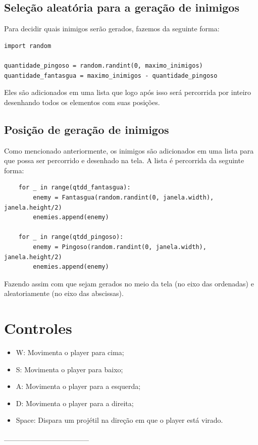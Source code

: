 \documentclass[a4paper]{scrreprt}
\begin{document}
	\subsection{Seleção aleatória para a geração de inimigos}
	Para decidir quais inimigos serão gerados, fazemos da seguinte forma:
	\begin{lstlisting}
import random

quantidade_pingoso = random.randint(0, maximo_inimigos)
quantidade_fantasgua = maximo_inimigos - quantidade_pingoso
\end{lstlisting}

Eles são adicionados em uma lista que logo após isso será percorrida por inteiro desenhando todos os elementos com suas posições.

	\subsection{Posição de geração de inimigos}
	Como mencionado anteriormente, os inimigos são adicionados em uma lista para que possa ser percorrido e desenhado na tela. A lista é percorrida da seguinte forma:
	\begin{lstlisting}
	for _ in range(qtdd_fantasgua):
        enemy = Fantasgua(random.randint(0, janela.width), janela.height/2)
        enemies.append(enemy)

    for _ in range(qtdd_pingoso):
        enemy = Pingoso(random.randint(0, janela.width), janela.height/2)
        enemies.append(enemy)

	\end{lstlisting}
	
	Fazendo assim com que sejam gerados no meio da tela (no eixo das ordenadas) e aleatoriamente (no eixo das abscissas).


    
    \section{Controles}
        \begin{itemize}
            \item W: Movimenta o player para cima;
            \item S: Movimenta o player para baixo;
            \item A: Movimenta o player para a esquerda;
            \item D: Movimenta o player para a direita;
            \item Space: Dispara um projétil na direção em que o player está virado.
        \end{itemize}
________________
\end{document}
